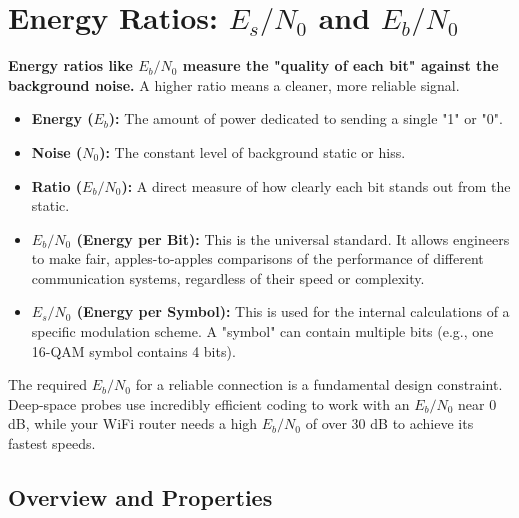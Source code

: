 
\chapter{Energy Ratios: \texorpdfstring{$E_s/N_0$ and $E_b/N_0$}{Es/N0 and Eb/N0}}
\label{ch:energy-ratios}

\begin{nontechnical}
    \textbf{Energy ratios like $E_b/N_0$ measure the "quality of each bit" against the background noise.} A higher ratio means a cleaner, more reliable signal.

    \begin{itemize}
        \item \textbf{Energy ($E_b$):} The amount of power dedicated to sending a single "1" or "0".
        \item \textbf{Noise ($N_0$):} The constant level of background static or hiss.
        \item \textbf{Ratio ($E_b/N_0$):} A direct measure of how clearly each bit stands out from the static.
    \end{itemize}

    \begin{itemize}
        \item \textbf{$E_b/N_0$ (Energy per Bit):} This is the universal standard. It allows engineers to make fair, apples-to-apples comparisons of the performance of different communication systems, regardless of their speed or complexity.
        \item \textbf{$E_s/N_0$ (Energy per Symbol):} This is used for the internal calculations of a specific modulation scheme. A "symbol" can contain multiple bits (e.g., one 16-QAM symbol contains 4 bits).
    \end{itemize}

     The required $E_b/N_0$ for a reliable connection is a fundamental design constraint. Deep-space probes use incredibly efficient coding to work with an $E_b/N_0$ near 0 dB, while your WiFi router needs a high $E_b/N_0$ of over 30 dB to achieve its fastest speeds.
\end{nontechnical}


\section{Overview and Properties}


